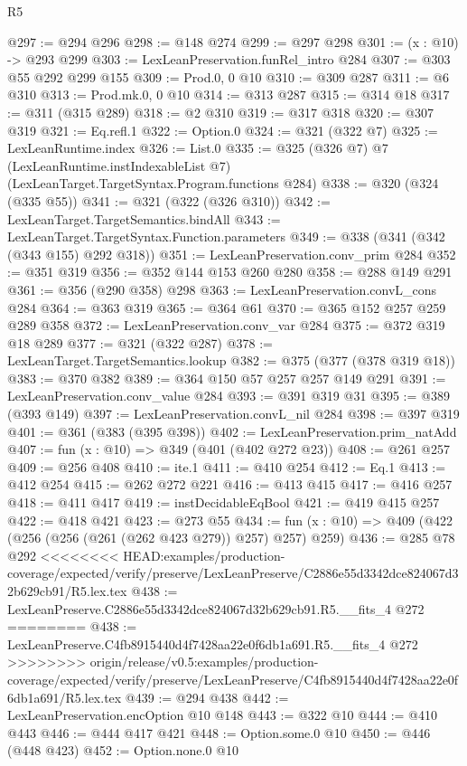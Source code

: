 \begin{lexlean}{R5}
\begin{coremodule}
{{{{{{{{{@297 := @294 @296
@298 := @148 @274
@299 := @297 @298
@301 := (x : @10) -> @293 @299
@303 := LexLeanPreservation.funRel_intro @284
@307 := @303 @55 @292 @299 @155
@309 := Prod.{0, 0} @10
@310 := @309 @287
@311 := @6 @310
@313 := Prod.mk.{0, 0} @10
@314 := @313 @287
@315 := @314 @18
@317 := @311 (@315 @289)
@318 := @2 @310
@319 := @317 @318
@320 := @307 @319
@321 := Eq.refl.{1}
@322 := Option.{0}
@324 := @321 (@322 @7)
@325 := LexLeanRuntime.index
@326 := List.{0}
@335 := @325
    (@326 @7)
    @7
    (LexLeanRuntime.instIndexableList @7)
    (LexLeanTarget.TargetSyntax.Program.functions @284)
@338 := @320 (@324 (@335 @55))
@341 := @321 (@322 (@326 @310))
@342 := LexLeanTarget.TargetSemantics.bindAll
@343 := LexLeanTarget.TargetSyntax.Function.parameters
@349 := @338 (@341 (@342 (@343 @155) @292 @318))
@351 := LexLeanPreservation.conv_prim @284
@352 := @351 @319
@356 := @352 @144 @153 @260 @280
@358 := @288 @149 @291
@361 := @356 (@290 @358) @298
@363 := LexLeanPreservation.convL_cons @284
@364 := @363 @319
@365 := @364 @61
@370 := @365 @152 @257 @259 @289 @358
@372 := LexLeanPreservation.conv_var @284
@375 := @372 @319 @18 @289
@377 := @321 (@322 @287)
@378 := LexLeanTarget.TargetSemantics.lookup
@382 := @375 (@377 (@378 @319 @18))
@383 := @370 @382
@389 := @364 @150 @57 @257 @257 @149 @291
@391 := LexLeanPreservation.conv_value @284
@393 := @391 @319 @31
@395 := @389 (@393 @149)
@397 := LexLeanPreservation.convL_nil @284
@398 := @397 @319
@401 := @361 (@383 (@395 @398))
@402 := LexLeanPreservation.prim_natAdd
@407 := fun (x : @10) => @349 (@401 (@402 @272 @23))
@408 := @261 @257
@409 := @256 @408
@410 := ite.{1}
@411 := @410 @254
@412 := Eq.{1}
@413 := @412 @254
@415 := @262 @272 @221
@416 := @413 @415
@417 := @416 @257
@418 := @411 @417
@419 := instDecidableEqBool
@421 := @419 @415 @257
@422 := @418 @421
@423 := @273 @55
@434 := fun (x : @10) => @409 (@422 (@256 (@256 (@261 (@262 @423 @279)) @257) @257) @259)
@436 := @285 @78 @292
<<<<<<<< HEAD:examples/production-coverage/expected/verify/preserve/LexLeanPreserve/C2886e55d3342dce824067d32b629cb91/R5.lex.tex
@438 := LexLeanPreserve.C2886e55d3342dce824067d32b629cb91.R5.__fits_4 @272
========
@438 := LexLeanPreserve.C4fb8915440d4f7428aa22e0f6db1a691.R5.__fits_4 @272
>>>>>>>> origin/release/v0.5:examples/production-coverage/expected/verify/preserve/LexLeanPreserve/C4fb8915440d4f7428aa22e0f6db1a691/R5.lex.tex
@439 := @294 @438
@442 := LexLeanPreservation.encOption @10 @148
@443 := @322 @10
@444 := @410 @443
@446 := @444 @417 @421
@448 := Option.some.{0} @10
@450 := @446 (@448 @423)
@452 := Option.none.{0} @10
}}}}}}}}}
\end{coremodule}
\end{lexlean}
